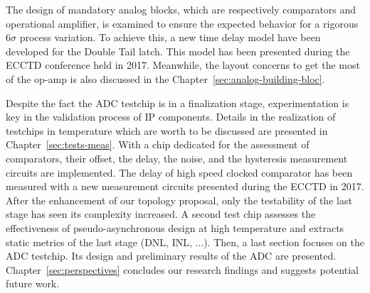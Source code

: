 The design of mandatory analog blocks, which are respectively comparators and operational amplifier, is examined to ensure the expected behavior for a rigorous 6\(\sigma\) process variation. To achieve this, a new time delay model have been developed for the Double Tail latch. This model has been presented during the ECCTD conference held in 2017. Meanwhile, the layout concerns to get the most of the op-amp is also discussed in the Chapter~\ref{sec:analog-building-bloc}.

Despite the fact the ADC testchip is in a finalization stage, experimentation is key in the validation process of IP components. Details in the realization of testchips in temperature which are worth to be discussed are presented in Chapter~\ref{sec:tests-meas}. With a chip dedicated for the assessment of comparators, their offset, the delay, the noise, and the hysteresis measurement circuits are implemented. The delay of high speed clocked comparator has been measured with a new measurement circuits presented during the ECCTD in 2017. After the enhancement of our topology proposal, only the testability of the last stage has seen its complexity increased. A second test chip assesses the effectiveness of pseudo-asynchronous design at high temperature and extracts static metrics of the last stage (DNL, INL, ...). Then, a last section focuses on the ADC testchip. Its design and preliminary results of the ADC are presented. Chapter~\ref{sec:perspectives} concludes our research findings and suggests potential future work.
